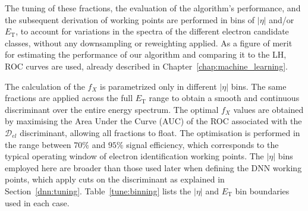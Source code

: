 The tuning of these fractions, the evaluation of the algorithm’s performance, and the subsequent derivation of working points are performed in bins of $|\eta|$ and/or $E_{\text{T}}$, to account for variations in the spectra of the different electron candidate classes, without any downsampling or reweighting applied. 
As a figure of merit for estimating the performance of our algorithm and comparing it to the LH, ROC curves are used, already described in Chapter~\ref{chap:machine_learning}.

The calculation of the $f_{X}$ is parametrized only in different $|\eta|$ bins. The same fractions are applied across the full $E_{\text{T}}$ range to obtain a smooth and continuous discriminant over the entire energy spectrum.
The optimal $f_{X}$ values are obtained by maximising the Area Under the Curve (AUC) of the ROC associated with the $\mathcal{D}_{el}$ discriminant, allowing all fractions to float. The optimisation is performed in the range between $70\%$ and $95\%$ signal efficiency, which corresponds to the typical operating window of electron identification working points. The $|\eta|$ bins employed here are broader than those used later when defining the DNN working points, which apply cuts on the discriminant as explained in Section~\ref{dnn:tuning}.
Table~\ref{tune:binning} lists the $|\eta|$ and $E_{\text{T}}$ bin boundaries used in each case.

